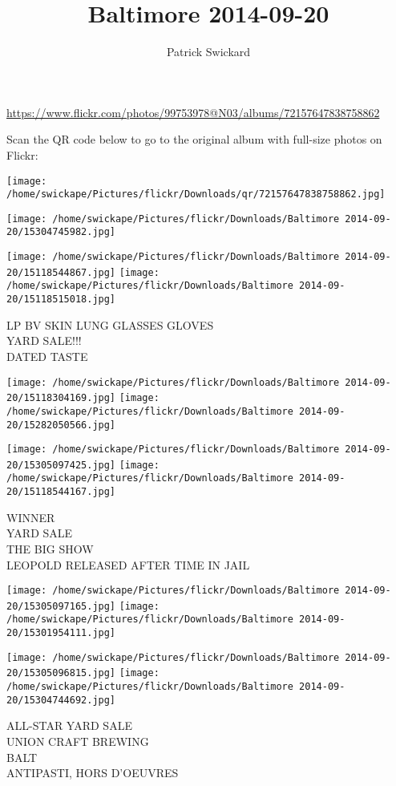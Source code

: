 \documentclass[10pt,letterpaper]{article}
\title{Baltimore 2014-09-20}
\author{Patrick Swickard}
\date{}
\begin{document}
\maketitle

\url{https://www.flickr.com/photos/99753978@N03/albums/72157647838758862}

Scan the QR code below to go to the original album with full-size photos on Flickr:

\texttt{[image: /home/swickape/Pictures/flickr/Downloads/qr/72157647838758862.jpg]}
\pagebreak

\texttt{[image: /home/swickape/Pictures/flickr/Downloads/Baltimore 2014-09-20/15304745982.jpg]}

\vspace{0.25in}
\texttt{[image: /home/swickape/Pictures/flickr/Downloads/Baltimore 2014-09-20/15118544867.jpg]}
\texttt{[image: /home/swickape/Pictures/flickr/Downloads/Baltimore 2014-09-20/15118515018.jpg]}

LP BV SKIN LUNG GLASSES GLOVES\\
YARD SALE!!!\\
DATED TASTE
\pagebreak

\texttt{[image: /home/swickape/Pictures/flickr/Downloads/Baltimore 2014-09-20/15118304169.jpg]}
\texttt{[image: /home/swickape/Pictures/flickr/Downloads/Baltimore 2014-09-20/15282050566.jpg]}

\texttt{[image: /home/swickape/Pictures/flickr/Downloads/Baltimore 2014-09-20/15305097425.jpg]}
\texttt{[image: /home/swickape/Pictures/flickr/Downloads/Baltimore 2014-09-20/15118544167.jpg]}

WINNER\\
YARD SALE\\
THE BIG SHOW\\
LEOPOLD RELEASED AFTER TIME IN JAIL
\pagebreak

\texttt{[image: /home/swickape/Pictures/flickr/Downloads/Baltimore 2014-09-20/15305097165.jpg]}
\texttt{[image: /home/swickape/Pictures/flickr/Downloads/Baltimore 2014-09-20/15301954111.jpg]}

\texttt{[image: /home/swickape/Pictures/flickr/Downloads/Baltimore 2014-09-20/15305096815.jpg]}
\texttt{[image: /home/swickape/Pictures/flickr/Downloads/Baltimore 2014-09-20/15304744692.jpg]}

ALL{-}STAR YARD SALE\\
UNION CRAFT BREWING\\
BALT\\
ANTIPASTI, HORS D'OEUVRES
\pagebreak
\end{document}
